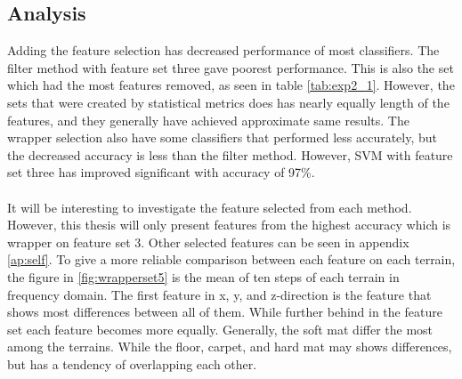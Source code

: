 \documentclass[USenglish]{ifimaster}  %
\begin{document}
\subsection{Analysis}
Adding the feature selection has decreased performance of most classifiers. The filter method with feature set three gave poorest performance. This is also the set which had the most features removed, as seen in table \ref{tab:exp2_1}. However, the sets that were created by statistical metrics does has nearly equally length of the features, and they generally have achieved approximate same results. The wrapper selection also have some classifiers that performed less accurately, but the decreased accuracy is less than the filter method. However, SVM with feature set three has improved significant with accuracy of 97\%.
\\
\\
It will be interesting to investigate the feature selected from each method. However, this thesis will only present features from the highest accuracy which is wrapper on feature set 3. Other selected features can be seen in appendix \ref{ap:self}. To give a more reliable comparison between each feature on each terrain, the figure in \ref{fig:wrapperset5} is the mean of ten steps of each terrain in frequency domain. The first feature in x, y, and z-direction is the feature that shows most differences between all of them. While further behind in the feature set each feature becomes more equally. Generally, the soft mat differ the most among the terrains. While the floor, carpet, and hard mat may shows differences, but has a tendency of overlapping each other.
\end{document}

